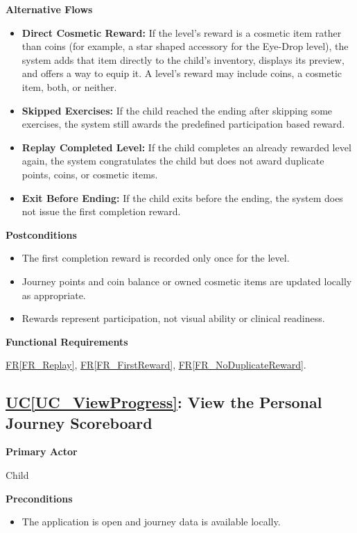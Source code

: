\documentclass[12pt]{article}
\newcounter{ucnum} %
\newcommand{\ucref}[1]{\hyperref[#1]{UC\ref*{#1}}}
\newcommand{\rref}[1]{\hyperref[#1]{FR\ref*{#1}}}
\begin{document}
\textbf{Alternative Flows}
\begin{itemize}
    \item \textbf{Direct Cosmetic Reward:} If the level's reward is
    a cosmetic item rather than coins (for example, a star shaped
    accessory for the Eye-Drop level), the system adds that item
    directly to the child's inventory, displays its preview, and
    offers a way to equip it. A level's reward may include coins, a
    cosmetic item, both, or neither.
    \item \textbf{Skipped Exercises:} If the child reached the ending
    after skipping some exercises, the system still awards the
    predefined participation based reward.
    \item \textbf{Replay Completed Level:} If the child completes an
    already rewarded level again, the system congratulates the child
    but does not award duplicate points, coins, or cosmetic items.
    \item \textbf{Exit Before Ending:} If the child exits before the
    ending, the system does not issue the first completion reward.
\end{itemize}

\textbf{Postconditions}
\begin{itemize}
    \item The first completion reward is recorded only once for
    the level.
    \item Journey points and coin balance or owned cosmetic items
    are updated locally as appropriate.
    \item Rewards represent participation, not visual ability
    or clinical readiness.
\end{itemize}

\textbf{Functional Requirements}

\rref{FR_Replay}, \rref{FR_FirstReward}, \rref{FR_NoDuplicateReward}.

\label{UC_ViewProgress}
\subsection{\ucref{UC_ViewProgress}: View the Personal Journey Scoreboard}

\textbf{Primary Actor}

Child

\textbf{Preconditions}
\begin{itemize}
    \item The application is open and journey data is available locally.
\end{itemize}
\end{document}
